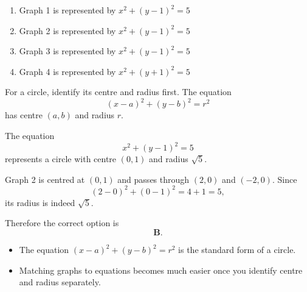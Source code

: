 \begin{problem}
\begin{enumerate}[label=\textbf{\Alph*.}]
\item Graph 1 is represented by $x^2+(y-1)^2=5$
\item Graph 2 is represented by $x^2+(y-1)^2=5$
\item Graph 3 is represented by $x^2+(y-1)^2=5$
\item Graph 4 is represented by $x^2+(y+1)^2=5$
\end{enumerate}
\end{problem}

\begin{hint}
For a circle, identify its centre and radius first. The equation
\[
(x-a)^2+(y-b)^2=r^2
\]
has centre $(a,b)$ and radius $r$.
\end{hint}

\begin{solution}
The equation
\[
x^2+(y-1)^2=5
\]
represents a circle with centre $(0,1)$ and radius $\sqrt5$.

Graph 2 is centred at $(0,1)$ and passes through $(2,0)$ and $(-2,0)$. Since
\[
(2-0)^2+(0-1)^2=4+1=5,
\]
its radius is indeed $\sqrt5$.

Therefore the correct option is
\[
\boxed{\textbf{B}.}
\]
\end{solution}

\begin{takeaways}
\begin{itemize}[leftmargin=*]
\item The equation $(x-a)^2+(y-b)^2=r^2$ is the standard form of a circle.
\item Matching graphs to equations becomes much easier once you identify centre and radius separately.
\end{itemize}
\end{takeaways}
